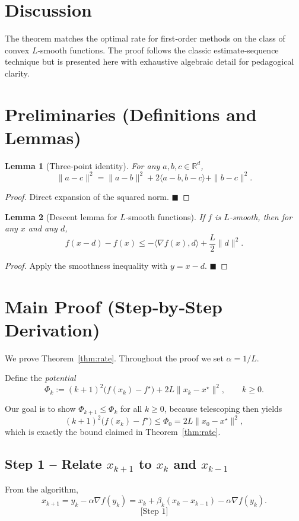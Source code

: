 \documentclass{article}
\newtheorem{lemma}{Lemma}
\begin{document}
\section*{Discussion}
The theorem matches the optimal rate for first‑order methods on the class of convex $L$‑smooth functions. The proof follows the classic estimate‑sequence technique but is presented here with exhaustive algebraic detail for pedagogical clarity.

\newpage
\section*{Preliminaries (Definitions and Lemmas)}
\begin{lemma}[Three‑point identity]\label{lem:3pt}
For any $a,b,c\in\mathbb{R}^{d}$,
\[
\|a-c\|^{2}= \|a-b\|^{2}+2\langle a-b,b-c\rangle+\|b-c\|^{2}.
\]
\end{lemma}
\begin{proof}
Direct expansion of the squared norm. \hfill $\blacksquare$
\end{proof}

\begin{lemma}[Descent lemma for $L$‑smooth functions]\label{lem:descent}
If $f$ is $L$‑smooth, then for any $x$ and any $d$,
\[
f(x-d)-f(x)\le -\langle\nabla f(x),d\rangle+\frac{L}{2}\|d\|^{2}.
\]
\end{lemma}
\begin{proof}
Apply the smoothness inequality with $y=x-d$. \hfill $\blacksquare$
\end{proof}

\section*{Main Proof (Step‑by‑Step Derivation)}
We prove Theorem~\ref{thm:rate}. Throughout the proof we set $\alpha=1/L$.

Define the \emph{potential}
\[
\Phi_{k}:=(k+1)^{2}\bigl(f(x_{k})-f^{\star}\bigr)+2L\|x_{k}-x^{\star}\|^{2},
\qquad k\ge 0.
\tag{P}
\]

Our goal is to show $\Phi_{k+1}\le\Phi_{k}$ for all $k\ge0$, because telescoping then yields
\[
(k+1)^{2}\bigl(f(x_{k})-f^{\star}\bigr)\le\Phi_{0}=2L\|x_{0}-x^{\star}\|^{2},
\]
which is exactly the bound claimed in Theorem~\ref{thm:rate}.

\subsection*{Step 1 – Relate $x_{k+1}$ to $x_{k}$ and $x_{k-1}$}
From the algorithm,
\[
x_{k+1}=y_{k}-\alpha\nabla f(y_{k})
          =x_{k}+ \beta_{k}(x_{k}-x_{k-1})-\alpha\nabla f(y_{k}).
\tag{1}
\]
\[
\text{[Step 1]}
\]
\end{document}
